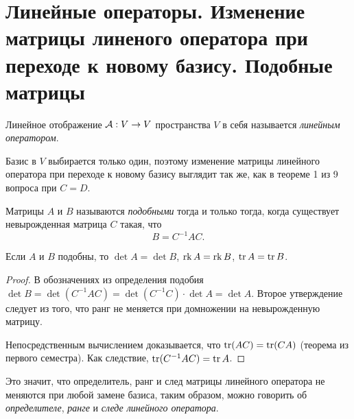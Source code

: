 \section{Линейные операторы. Изменение матрицы линеного оператора при переходе к новому базису. Подобные матрицы}

\begin{definition}
    Линейное отображение $\mathcal{A}: V \to V$ пространства $V$ в себя называется \textit{линейным оператором}.
\end{definition}

Базис в $V$ выбирается только один, поэтому изменение матрицы линейного оператора при переходе к новому базису выглядит так же, как в теореме 1 из 9 вопроса при $C = D$.

\begin{definition}
    Матрицы $A$ и $B$ называются \textit{подобными} тогда и только тогда, когда существует невырожденная матрица $C$ такая, что
    \[
        B = C^{-1}AC.
    \]
\end{definition}

\begin{proposal}
    Если $A$ и $B$ подобны, то $\det A = \det B$, $\operatorname{rk} A = \operatorname{rk} B$, $\operatorname{tr} A = \operatorname{tr} B$.
\end{proposal}

\begin{proof}
    В обозначениях из определения подобия $\det B = \det(C^{-1}AC) = \det(C^{-1}C) \cdot \det A = \det A$. Второе утверждение следует из того, что ранг не меняется при домножении на невырожденную матрицу.

    Непосредственным вычислением доказывается, что $\operatorname{tr}(AC) = \operatorname{tr}(CA)$ (теорема из первого семестра). Как следствие, $\operatorname{tr}(C^{-1}AC) = \operatorname{tr} A$.
\end{proof}

Это значит, что определитель, ранг и след матрицы линейного оператора не меняются при любой замене базиса, таким образом, можно говорить об \textit{определителе}, \textit{ранге} и \textit{следе линейного оператора}.

